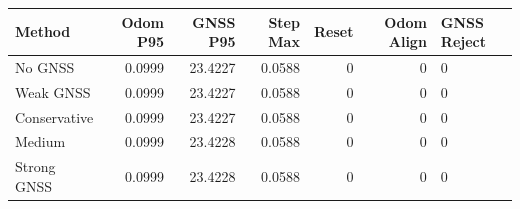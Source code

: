 \begin{tabular}{lrrrrr}
\hline
Method & Odom P95 & GNSS P95 & Step Max & Reset & Odom Align & GNSS Reject \\
\hline
No GNSS & 0.0999 & 23.4227 & 0.0588 & 0 & 0 & 0 \\
Weak GNSS & 0.0999 & 23.4227 & 0.0588 & 0 & 0 & 0 \\
Conservative & 0.0999 & 23.4227 & 0.0588 & 0 & 0 & 0 \\
Medium & 0.0999 & 23.4228 & 0.0588 & 0 & 0 & 0 \\
Strong GNSS & 0.0999 & 23.4228 & 0.0588 & 0 & 0 & 0 \\
\hline
\end{tabular}
